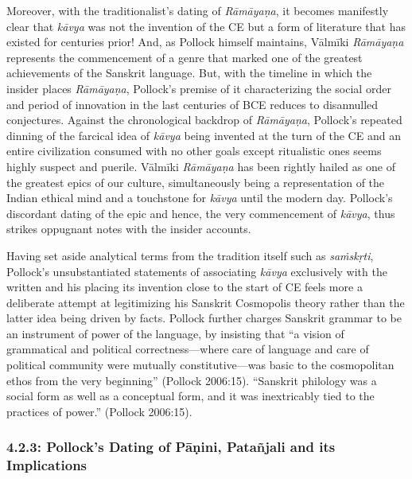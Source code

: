 Moreover, with the traditionalist’s dating of \textit{Rāmāyaṇa}, it becomes manifestly clear that \textit{kāvya} was not the invention of the CE but a form of literature that has existed for centuries prior! And, as Pollock himself maintains, Vālmīki \textit{Rāmāyaṇa} represents the commencement of a genre that marked one of the greatest achievements of the Sanskrit language. But, with the timeline in which the insider places \textit{Rāmāyaṇa}, Pollock’s premise of it characterizing the social order and period of innovation in the last centuries of BCE reduces to disannulled conjectures. Against the chronological backdrop of \textit{Rāmāyaṇa}, Pollock’s repeated dinning of the farcical idea of \textit{kāvya} being invented at the turn of the CE and an entire civilization consumed with no other goals except ritualistic ones seems highly suspect and puerile. Vālmīki \textit{Rāmāyaṇa} has been rightly hailed as one of the greatest epics of our culture, simultaneously being a representation of the Indian ethical mind and a touchstone for \textit{kāvya} until the modern day. Pollock’s discordant dating of the epic and hence, the very commencement of \textit{kāvya}, thus strikes oppugnant notes with the insider accounts.

Having set aside analytical terms from the tradition itself such as \textit{saṁskṛti}, Pollock’s unsubstantiated statements of associating \textit{kāvya} exclusively with the written and his placing its invention close to the start of CE feels more a deliberate attempt at legitimizing his Sanskrit Cosmopolis theory rather than the latter idea being driven by facts. Pollock further charges Sanskrit grammar to be an instrument of power of the language, by insisting that “a vision of grammatical and political correctness—where care of language and care of political community were mutually constitutive—was basic to the cosmopolitan ethos from the very beginning” (Pollock 2006:15). “Sanskrit philology was a social form as well as a conceptual form, and it was inextricably tied to the practices of power.” (Pollock 2006:15).

\vspace{-.3cm}

\subsubsection*{4.2.3: Pollock’s Dating of Pāṇini, Patañjali and its Implications}

